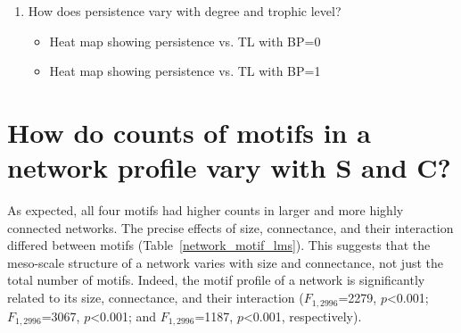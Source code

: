 \documentclass[12pt]{article}
\begin{document}
\begin{spacing}{2.0}
\begin{spacing}{1.0}
\begin{enumerate}
        \item How does persistence vary with degree and trophic level?

            \begin{itemize}
                \item Heat map showing persistence vs. TL with BP=0
                \item Heat map showing persistence vs. TL with BP=1
            \end{itemize}
    
    \end{enumerate}
\end{spacing}
\clearpage

   
\section{How do counts of motifs in a network profile vary with S and C?} 

    
    As expected, all four motifs had higher counts in larger and more highly connected networks.
    The precise effects of size, connectance, and their interaction differed between motifs  (Table~\ref{network_motif_lms}).
    This suggests that the meso-scale structure of a network varies with size and connectance, not just the total number of motifs.
    Indeed, the motif profile of a network is significantly related to its size, connectance, and their interaction ($F_{1,2996}$=2279, $p$\textless0.001; $F_{1,2996}$=3067, $p$\textless0.001; and $F_{1,2996}$=1187, $p$\textless0.001, respectively).



\end{spacing}
\end{document}
